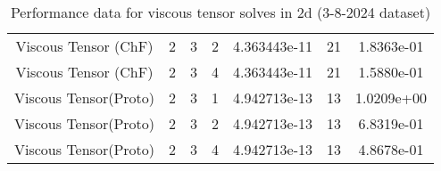 \documentclass{article}
\begin{document}
\begin{small}
\begin{table}
\begin{center}
\begin{tabular}{|c|c|c|c|c|c||c|}
        Viscous Tensor  (ChF) & 2 & 3 & 2& 4.363443e-11 & 21 & 1.8363e-01\\
        Viscous Tensor  (ChF) & 2 & 3 & 4& 4.363443e-11 & 21 & 1.5880e-01\\
        Viscous Tensor(Proto) & 2 & 3 & 1& 4.942713e-13 & 13 & 1.0209e+00\\
        Viscous Tensor(Proto) & 2 & 3 & 2& 4.942713e-13 & 13 & 6.8319e-01\\
        Viscous Tensor(Proto) & 2 & 3 & 4& 4.942713e-13 & 13 & 4.8678e-01\\
        \hline 
      \end{tabular} 
    \end{center}   
    \label{tab::datareductiontable3102024.visc_2} 
    \caption{Performance data for  viscous tensor solves in 2d (3-8-2024 dataset)}
  \end{table} 
\end{small}
\end{document}
